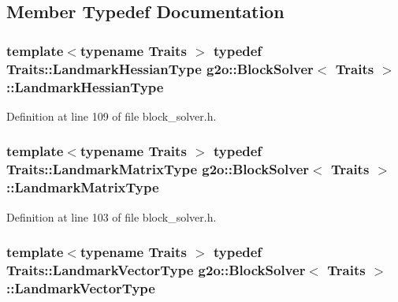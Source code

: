 \subsection{Member Typedef Documentation}
\subsubsection[{\texorpdfstring{Landmark\+Hessian\+Type}{LandmarkHessianType}}]{\setlength{\rightskip}{0pt plus 5cm}template$<$typename Traits $>$ typedef Traits\+::\+Landmark\+Hessian\+Type {\bf g2o\+::\+Block\+Solver}$<$ Traits $>$\+::{\bf Landmark\+Hessian\+Type}}\hypertarget{classg2o_1_1BlockSolver_a465b1252905d90fd69b4243716620c45}{}\label{classg2o_1_1BlockSolver_a465b1252905d90fd69b4243716620c45}


Definition at line 109 of file block\+\_\+solver.\+h.

\subsubsection[{\texorpdfstring{Landmark\+Matrix\+Type}{LandmarkMatrixType}}]{\setlength{\rightskip}{0pt plus 5cm}template$<$typename Traits $>$ typedef Traits\+::\+Landmark\+Matrix\+Type {\bf g2o\+::\+Block\+Solver}$<$ Traits $>$\+::{\bf Landmark\+Matrix\+Type}}\hypertarget{classg2o_1_1BlockSolver_afd898a666343291129d37a979e23ded6}{}\label{classg2o_1_1BlockSolver_afd898a666343291129d37a979e23ded6}


Definition at line 103 of file block\+\_\+solver.\+h.

\subsubsection[{\texorpdfstring{Landmark\+Vector\+Type}{LandmarkVectorType}}]{\setlength{\rightskip}{0pt plus 5cm}template$<$typename Traits $>$ typedef Traits\+::\+Landmark\+Vector\+Type {\bf g2o\+::\+Block\+Solver}$<$ Traits $>$\+::{\bf Landmark\+Vector\+Type}}\hypertarget{classg2o_1_1BlockSolver_a19ade5e432f32e46557192ae75074304}{}\label{classg2o_1_1BlockSolver_a19ade5e432f32e46557192ae75074304}


